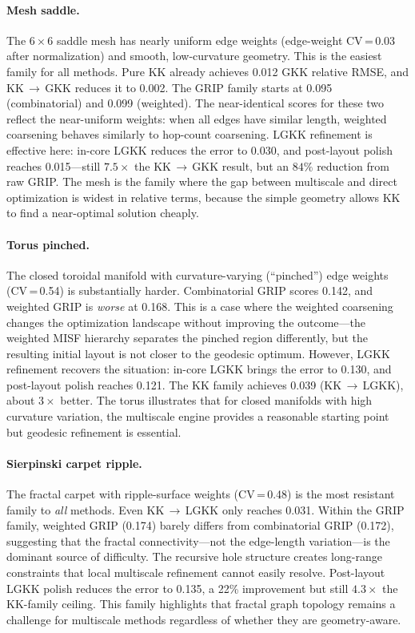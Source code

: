 \documentclass[11pt,twocolumn]{article}
\begin{document}
\paragraph{Mesh saddle.}
The $6 \times 6$ saddle mesh has nearly uniform edge weights
(edge-weight CV\,=\,0.03 after normalization) and smooth, low-curvature
geometry.  This is the easiest family for all methods.  Pure KK already
achieves 0.012 GKK relative RMSE, and KK\,$\to$\,GKK reduces it to
0.002.  The GRIP family starts at 0.095 (combinatorial) and 0.099
(weighted).  The near-identical scores for these two reflect the
near-uniform weights: when all edges have similar length, weighted
coarsening behaves similarly to hop-count coarsening.  LGKK refinement
is effective here: in-core LGKK reduces the error to 0.030, and
post-layout polish reaches 0.015---still $7.5\times$ the KK\,$\to$\,GKK
result, but an $84\%$ reduction from raw GRIP.  The mesh is the family
where the gap between multiscale and direct optimization is widest in
relative terms, because the simple geometry allows KK to find a
near-optimal solution cheaply.

\paragraph{Torus pinched.}
The closed toroidal manifold with curvature-varying (``pinched'') edge
weights (CV\,=\,0.54) is substantially harder.  Combinatorial GRIP
scores 0.142, and weighted GRIP is \emph{worse} at 0.168.  This is a
case where the weighted coarsening changes the optimization landscape
without improving the outcome---the weighted MISF hierarchy separates
the pinched region differently, but the resulting initial layout is not
closer to the geodesic optimum.  However, LGKK refinement recovers
the situation: in-core LGKK brings the error to 0.130, and post-layout
polish reaches 0.121.  The KK family achieves 0.039 (KK\,$\to$\,LGKK),
about $3\times$ better.  The torus illustrates that for closed manifolds
with high curvature variation, the multiscale engine provides a
reasonable starting point but geodesic refinement is essential.

\paragraph{Sierpinski carpet ripple.}
The fractal carpet with ripple-surface weights (CV\,=\,0.48) is the
most resistant family to \emph{all} methods.  Even KK\,$\to$\,LGKK only
reaches 0.031.  Within the GRIP family, weighted GRIP (0.174) barely
differs from combinatorial GRIP (0.172), suggesting that the fractal
connectivity---not the edge-length variation---is the dominant source of
difficulty.  The recursive hole structure creates long-range constraints
that local multiscale refinement cannot easily resolve.  Post-layout
LGKK polish reduces the error to 0.135, a 22\% improvement but still
$4.3\times$ the KK-family ceiling.  This family highlights that
fractal graph topology remains a challenge for multiscale methods
regardless of whether they are geometry-aware.
\end{document}
